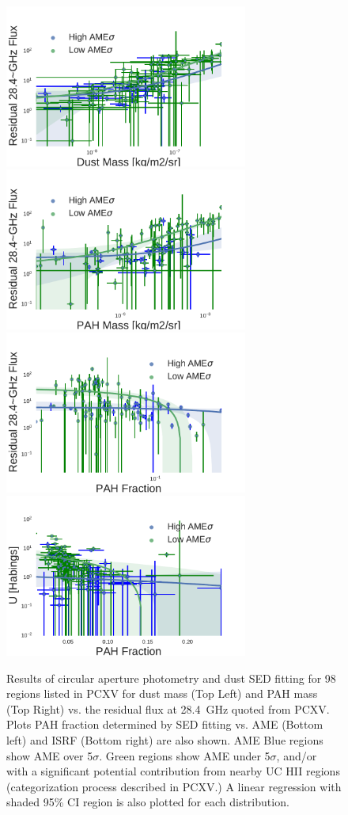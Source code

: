 \documentclass[preprint2,longabstract]{aastex}
\begin{document}
\begin{figure}
  \label{fig:AME_regs_J13}
  \includegraphics[width=80mm]{../Plots/RegsAMEvsDustMass.pdf}
  \includegraphics[width=80mm]{../Plots/RegsAMEvsPAHMass.pdf}
  \includegraphics[width=80mm]{../Plots/RegsAMEvsqPAH.pdf}
  \includegraphics[width=80mm]{../Plots/RegsUvsqPAH.pdf}
  \centering
  \caption{Results of circular aperture photometry and dust SED fitting for 98 regions listed in PCXV for dust mass (Top Left) and PAH mass (Top Right) vs. the residual flux at 28.4~GHz quoted from PCXV. Plots PAH fraction determined by SED fitting vs. AME (Bottom left) and ISRF (Bottom right) are also shown. AME Blue regions show AME over 5$\sigma$. Green regions show AME under 5$\sigma$, and/or with a significant potential contribution from nearby UC HII regions (categorization process described in PCXV.) A linear regression with shaded 95\% CI region is also plotted for each distribution.}
\end{figure}
\end{document}
